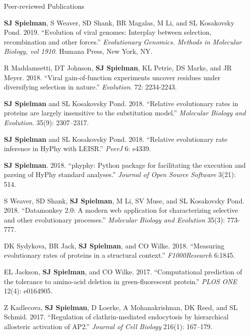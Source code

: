 \documentclass{resume} %
\begin{document}
\begin{rSection}{Peer-reviewed Publications}
\begin{etaremune}[leftmargin=1.5em]
\item \textbf{SJ Spielman}, S Weaver, SD Shank, BR Magalas, M Li, and SL Kosakovsky Pond. 2019. ``Evolution of viral genomes: Interplay between selection, recombination and other forces.'' \emph{Evolutionary Genomics. Methods in Molecular Biology, vol 1910}. Humana Press, New York, NY.

\item R Maddamsetti, DT Johnson, \textbf{SJ Spielman}, KL Petrie, DS Marks, and JR Meyer. 2018. ``Viral gain-of-function experiments uncover residues under diversifying selection in nature.'' \emph{Evolution}. 72: 2234-2243.

\item \textbf{SJ Spielman} and SL Kosakovsky Pond. 2018. ``Relative evolutionary rates in proteins are largely insensitive to the substitution model.'' \emph{Molecular Biology and Evolution}. 35(9): 2307–2317.

\item \textbf{SJ Spielman} and SL Kosakovsky Pond. 2018. ``Relative evolutionary rate inference in HyPhy with LEISR.'' \emph{PeerJ} 6: e4339.

\item \textbf{SJ Spielman}. 2018. ``phyphy: Python package for facilitating the execution and parsing of HyPhy standard analyses.''  \emph{Journal of Open Source Software} 3(21): 514.

\item S Weaver, SD Shank, \textbf{SJ Spielman}, M Li, SV Muse, and SL Kosakovsky Pond. 2018. ``Datamonkey 2.0: A modern web application for characterizing selective and other evolutionary processes.'' \emph{Molecular Biology and Evolution} 35(3): 773-777.

\item DK Sydykova, BR Jack, \textbf{SJ Spielman}, and CO Wilke. 2018. ``Measuring evolutionary rates of proteins in a structural context.'' \emph{F1000Research} 6:1845.

\item EL Jackson, \textbf{SJ Spielman}, and CO Wilke. 2017. ``Computational prediction of the tolerance to amino-acid deletion in green-fluorescent protein.'' \emph{PLOS ONE} 12(4): e0164905.

\item Z Kadlecova, \textbf{SJ Spielman}, D Loerke, A Mohanakrishnan, DK Reed, and SL Schmid. 2017. ``Regulation of clathrin-mediated endocytosis by hierarchical allosteric activation of AP2.'' \emph{Journal of Cell Biology} 216(1): 167--179.


\end{etaremune}
\end{rSection}
\end{document}
